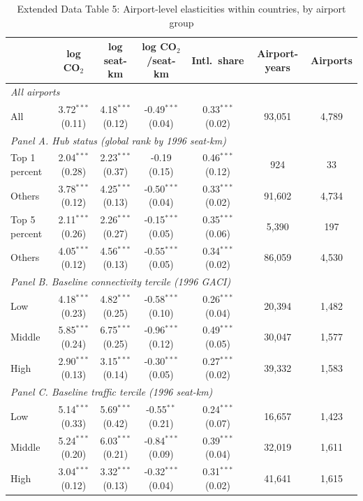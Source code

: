 \documentclass[12pt]{article}
\begin{document}
\begin{table}[htbp]
\centering
\begin{threeparttable}
\caption{Extended Data Table 5: Airport-level elasticities within countries, by airport group}
\label{tab:airport_het}
\scriptsize
\begin{tabular}{lcccccc}
\toprule
 & log CO$_2$ & log seat-km & log CO$_2$/seat-km & Intl.\ share & Airport-years & Airports \\
\midrule
\multicolumn{7}{l}{\textit{All airports}} \\
  All & 3.72$^{***}$ (0.11) & 4.18$^{***}$ (0.12) & -0.49$^{***}$ (0.04) & 0.33$^{***}$ (0.02) & 93,051 & 4,789 \\
\multicolumn{7}{l}{\textit{Panel A. Hub status (global rank by 1996 seat-km)}} \\
  Top 1 percent & 2.04$^{***}$ (0.28) & 2.23$^{***}$ (0.37) & -0.19 (0.15) & 0.46$^{***}$ (0.12) & 924 & 33 \\
  Others & 3.78$^{***}$ (0.12) & 4.25$^{***}$ (0.13) & -0.50$^{***}$ (0.04) & 0.33$^{***}$ (0.02) & 91,602 & 4,734 \\
  Top 5 percent & 2.11$^{***}$ (0.26) & 2.26$^{***}$ (0.27) & -0.15$^{***}$ (0.05) & 0.35$^{***}$ (0.06) & 5,390 & 197 \\
  Others & 4.05$^{***}$ (0.12) & 4.56$^{***}$ (0.13) & -0.55$^{***}$ (0.05) & 0.34$^{***}$ (0.02) & 86,059 & 4,530 \\
\multicolumn{7}{l}{\textit{Panel B. Baseline connectivity tercile (1996 GACI)}} \\
  Low & 4.18$^{***}$ (0.23) & 4.82$^{***}$ (0.25) & -0.58$^{***}$ (0.10) & 0.26$^{***}$ (0.04) & 20,394 & 1,482 \\
  Middle & 5.85$^{***}$ (0.24) & 6.75$^{***}$ (0.25) & -0.96$^{***}$ (0.12) & 0.49$^{***}$ (0.05) & 30,047 & 1,577 \\
  High & 2.90$^{***}$ (0.13) & 3.15$^{***}$ (0.14) & -0.30$^{***}$ (0.05) & 0.27$^{***}$ (0.02) & 39,332 & 1,583 \\
\multicolumn{7}{l}{\textit{Panel C. Baseline traffic tercile (1996 seat-km)}} \\
  Low & 5.14$^{***}$ (0.33) & 5.69$^{***}$ (0.42) & -0.55$^{**}$ (0.21) & 0.24$^{***}$ (0.07) & 16,657 & 1,423 \\
  Middle & 5.24$^{***}$ (0.20) & 6.03$^{***}$ (0.21) & -0.84$^{***}$ (0.09) & 0.39$^{***}$ (0.04) & 32,019 & 1,611 \\
  High & 3.04$^{***}$ (0.12) & 3.32$^{***}$ (0.13) & -0.32$^{***}$ (0.04) & 0.31$^{***}$ (0.02) & 41,641 & 1,615 \\

\end{tabular}
\end{threeparttable}
\end{table}
\end{document}
